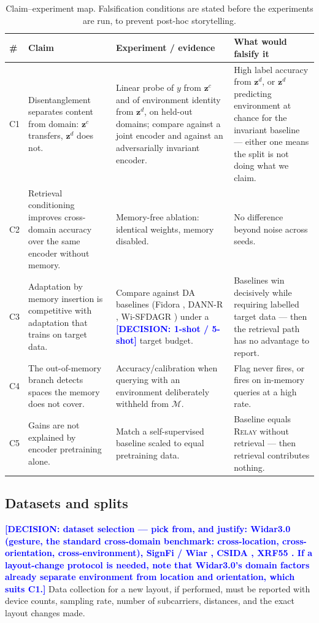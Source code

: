 \documentclass[conference]{IEEEtran}
\newcommand{\method}{\textsc{Relay}}
\newcommand{\DECISION}[1]{\textcolor{blue}{\textbf{[DECISION: #1]}}}
\newcommand{\zc}{\mathbf{z}^{c}}      %
\newcommand{\zd}{\mathbf{z}^{d}}      %
\begin{document}
\begin{table}[t]
\centering
\caption{Claim--experiment map. Falsification conditions are stated before the experiments
are run, to prevent post-hoc storytelling.}
\label{tab:claims}
\small
\begin{tabular}{p{}p{}p{}p{}}
\toprule
\# & Claim & Experiment / evidence & What would falsify it \\
\midrule
C1 & Disentanglement separates content from domain: $\zc$ transfers, $\zd$ does not. & Linear probe of $y$ from $\zc$ and of environment identity from $\zd$, on held-out domains; compare against a joint encoder and against an adversarially invariant encoder. & High label accuracy from $\zd$, or $\zd$ predicting environment at chance for the invariant baseline --- either one means the split is not doing what we claim. \\
C2 & Retrieval conditioning improves cross-domain accuracy over the same encoder without memory. & Memory-free ablation: identical weights, memory disabled. & No difference beyond noise across seeds. \\
C3 & Adaptation by memory insertion is competitive with adaptation that trains on target data. & Compare against DA baselines (Fidora \cite{Chen2022Fidora}, DANN-R \cite{Prasad2024DANN}, Wi-SFDAGR \cite{Yan2025WiSFDAGR}) under a \DECISION{1-shot / 5-shot} target budget. & Baselines win decisively while requiring labelled target data --- then the retrieval path has no advantage to report. \\
C4 & The out-of-memory branch detects spaces the memory does not cover. & Accuracy/calibration when querying with an environment deliberately withheld from $\mathcal{M}$. & Flag never fires, or fires on in-memory queries at a high rate. \\
C5 & Gains are not explained by encoder pretraining alone. & Match a self-supervised baseline scaled to equal pretraining data. & Baseline equals \method{} without retrieval --- then retrieval contributes nothing. \\
\bottomrule
\end{tabular}
\end{table}

\subsection{Datasets and splits}
\DECISION{dataset selection --- pick from, and justify: Widar3.0 \cite{Zheng2019Widar3}
(gesture, the standard cross-domain benchmark: cross-location, cross-orientation,
cross-environment), SignFi / Wiar \cite{Yin2022FewSense}, CSIDA \cite{Xu2023ARCFi},
XRF55 \cite{Yan2025WiSFDAGR}. If a layout-change protocol is needed, note that Widar3.0's
domain factors already separate environment from location and orientation, which suits C1.}
Data collection for a new layout, if performed, must be reported with device counts,
sampling rate, number of subcarriers, distances, and the exact layout changes made.
\end{document}
